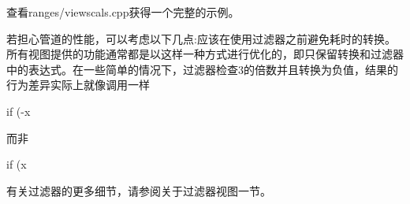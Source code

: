 查看ranges/viewscals.cpp获得一个完整的示例。

若担心管道的性能，可以考虑以下几点:应该在使用过滤器之前避免耗时的转换。所有视图提供的功能通常都是以这样一种方式进行优化的，即只保留转换和过滤器中的表达式。在一些简单的情况下，过滤器检查3的倍数并且转换为负值，结果的行为差异实际上就像调用一样

\begin{cpp}
if (-x %
\end{cpp}

而非

\begin{cpp}
if (x %
\end{cpp}

有关过滤器的更多细节，请参阅关于过滤器视图一节。
